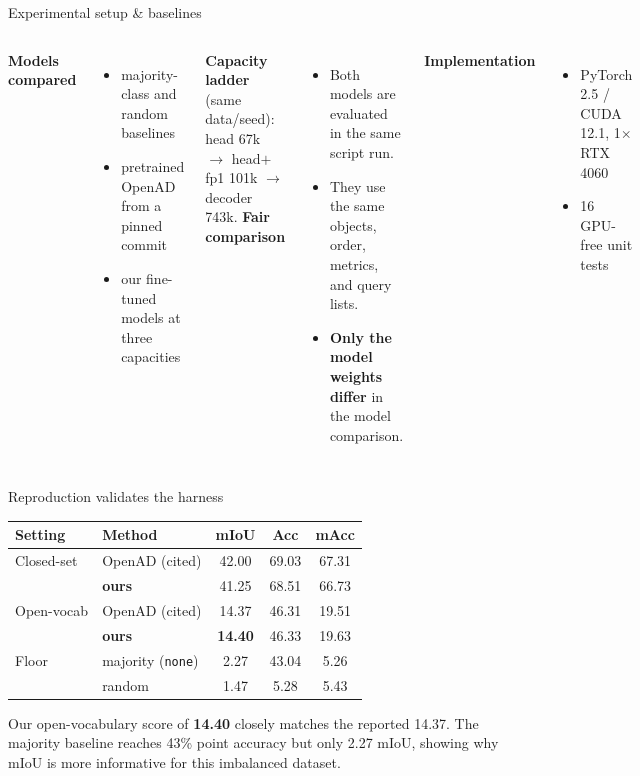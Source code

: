 \documentclass[aspectratio=169,10pt]{beamer}
\newcommand{\up}[1]{\textcolor{acc}{\textbf{#1}}}
\begin{document}
\begin{frame}{Experimental setup \& baselines}
  \begin{columns}[T]
    \textbf{Models compared}
    \begin{itemize}\small
      \item majority-class and random baselines
      \item pretrained OpenAD from a pinned commit
      \item our fine-tuned models at three capacities
    \end{itemize}
    \textbf{Capacity ladder} (same data/seed):\\
    head 67k $\to$ head$+$fp1 101k $\to$ decoder 743k.
    \textbf{Fair comparison}
    \begin{itemize}\small
      \item Both models are evaluated in the same script run.
      \item They use the same objects, order, metrics, and query lists.
      \item \up{Only the model weights differ} in the model comparison.
    \end{itemize}
    \textbf{Implementation}
    \begin{itemize}\small
      \item PyTorch 2.5 / CUDA 12.1, 1$\times$ RTX 4060
      \item 16 GPU-free unit tests
    \end{itemize}
  \end{columns}
\end{frame}

\begin{frame}{Reproduction validates the harness}
  \centering\small
  \begin{tabular}{@{}llccc@{}}
    \toprule
    Setting & Method & mIoU & Acc & mAcc \\
    \midrule
    Closed-set & OpenAD (cited) & 42.00 & 69.03 & 67.31 \\
               & \up{ours} & 41.25 & 68.51 & 66.73 \\
    \midrule
    Open-vocab & OpenAD (cited) & 14.37 & 46.31 & 19.51 \\
               & \up{ours} & \up{14.40} & 46.33 & 19.63 \\
    \midrule
    Floor & majority (\texttt{none}) & 2.27 & 43.04 & 5.26 \\
          & random & 1.47 & 5.28 & 5.43 \\
    \bottomrule
  \end{tabular}

  \medskip
  {\footnotesize Our open-vocabulary score of \up{14.40} closely matches the reported 14.37.
  The majority baseline reaches 43\% point accuracy but only 2.27 mIoU, showing why mIoU is
  more informative for this imbalanced dataset.}
\end{frame}
\end{document}
